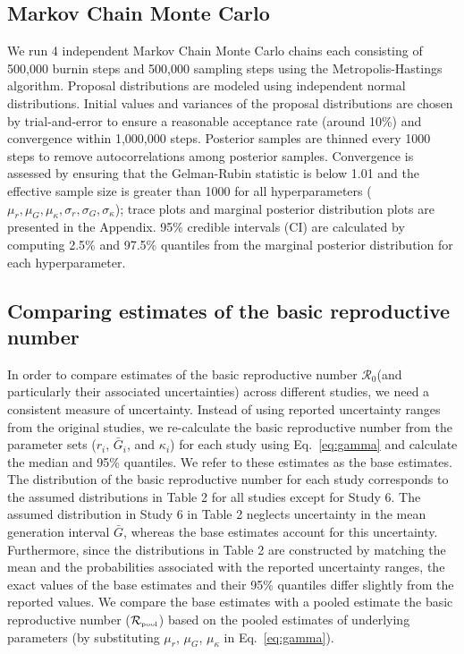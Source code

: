 \documentclass[12pt]{article}
\newcommand{\eref}[1]{Eq.~\ref{eq:#1}}
\newcommand{\Ro}{\ensuremath{{\mathcal R}_{0}}\xspace}
\newcommand{\Rpool}{\ensuremath{{\mathcal R}_{\textrm{\tiny{pool}}}}\xspace}
\begin{document}
\subsection{Markov Chain Monte Carlo}
\label{section:MCMC}

We run 4 independent Markov Chain Monte Carlo chains each consisting of 500,000 burnin steps and 500,000 sampling steps using the Metropolis-Hastings algorithm.
Proposal distributions are modeled using independent normal distributions.
Initial values and variances of the proposal distributions are chosen by trial-and-error to ensure a reasonable acceptance rate (around 10\%) and convergence within 1,000,000 steps.
Posterior samples are thinned every 1000 steps to remove autocorrelations among posterior samples.
Convergence is assessed by ensuring that the Gelman-Rubin statistic is below 1.01  \citep{gelman1992inference} and the effective sample size is greater than 1000 for all hyperparameters ($\mu_r, \mu_G, \mu_\kappa, \sigma_r, \sigma_G, \sigma_\kappa$);
trace plots and marginal posterior distribution plots are presented in the Appendix.
95\% credible intervals (CI) are calculated by computing 2.5\% and 97.5\% quantiles from the marginal posterior distribution for each hyperparameter.

\subsection{Comparing estimates of the basic reproductive number}

In order to compare estimates of the basic reproductive number \Ro (and particularly their associated uncertainties) across different studies, we need a consistent measure of uncertainty.
Instead of using reported uncertainty ranges from the original studies, we re-calculate the basic reproductive number from the parameter sets ($r_i$, $\bar G_i$, and $\kappa_i$) for each study using \eref{gamma} and calculate the median and 95\% quantiles.
We refer to these estimates as the base estimates.
The distribution of the basic reproductive number for each study corresponds to the assumed distributions in Table 2 for all studies except for Study 6.
The assumed distribution in Study 6 in Table 2 neglects uncertainty in the mean generation interval $\bar G$, whereas the base estimates account for this uncertainty.
Furthermore, since the distributions in Table 2 are constructed by matching the mean and the probabilities associated with the reported uncertainty ranges, the exact values of the base estimates and their 95\% quantiles differ slightly from the reported values.
We compare the base estimates with a pooled estimate the basic reproductive number (\Rpool) based on the pooled estimates of underlying parameters (by substituting $\mu_r$, $\mu_G$, $\mu_\kappa$ in \eref{gamma}). 
\end{document}
